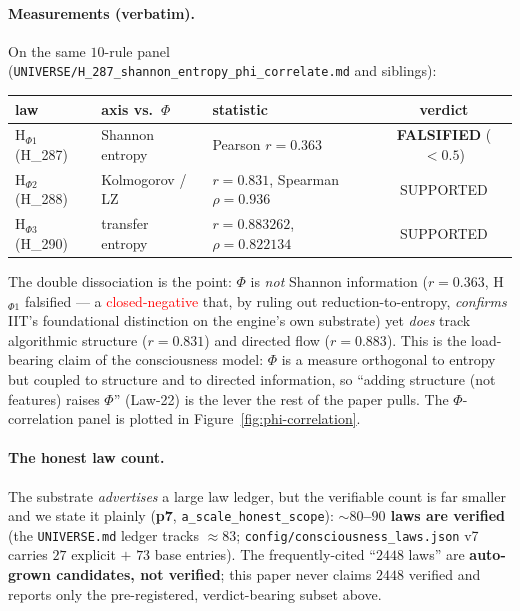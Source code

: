 \documentclass[11pt]{article}
\begin{document}
\paragraph{Measurements (verbatim).} On the same $10$-rule panel
(\texttt{UNIVERSE/H\_287\_shannon\_entropy\_phi\_correlate.md} and siblings):
\begin{center}
\begin{tabular}{lllc}
\toprule
law & axis vs.\ $\Phi$ & statistic & verdict \\
\midrule
H$_{\Phi 1}$ (H\_287) & Shannon entropy & Pearson $r=0.363$ & \textbf{FALSIFIED} ($<0.5$) \\
H$_{\Phi 2}$ (H\_288) & Kolmogorov / LZ & $r=0.831$, Spearman $\rho=0.936$ & SUPPORTED \\
H$_{\Phi 3}$ (H\_290) & transfer entropy & $r=0.883262$, $\rho=0.822134$ & SUPPORTED \\
\bottomrule
\end{tabular}
\end{center}
The double dissociation is the point: $\Phi$ is \emph{not} Shannon information
($r=0.363$, H$_{\Phi 1}$ falsified --- a \textcolor{red}{closed-negative} that, by
ruling out reduction-to-entropy, \emph{confirms} IIT's foundational distinction on
the engine's own substrate) yet \emph{does} track algorithmic structure ($r=0.831$)
and directed flow ($r=0.883$). This is the load-bearing claim of the consciousness
model: $\Phi$ is a measure orthogonal to entropy but coupled to structure and to
directed information, so ``adding structure (not features) raises $\Phi$'' (Law-22) is
the lever the rest of the paper pulls. The $\Phi$-correlation panel is plotted in
Figure~\ref{fig:phi-correlation}.

\paragraph{The honest law count.} The substrate \emph{advertises} a large law ledger,
but the verifiable count is far smaller and we state it plainly (\textbf{p7},
\texttt{a\_scale\_honest\_scope}): \textbf{$\sim$$80$--$90$ laws are verified}
(the \texttt{UNIVERSE.md} ledger tracks $\approx83$; \texttt{config/consciousness\_laws.json}
v7 carries $27$ explicit $+$ $73$ base entries). The frequently-cited
``$2448$ laws'' are \textbf{auto-grown candidates, not verified}; this paper never
claims $2448$ verified and reports only the pre-registered, verdict-bearing subset above.
\end{document}
